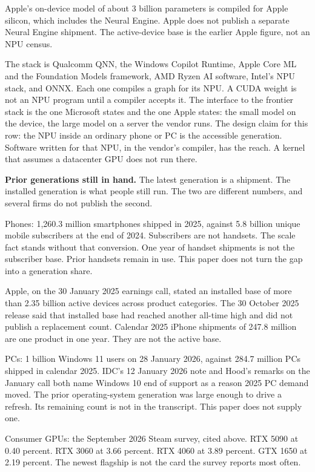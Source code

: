 \documentclass[
  10pt,
]{article}
\begin{document}
Apple's on-device model of about 3 billion parameters is compiled for
Apple silicon, which includes the Neural Engine. Apple does not publish
a separate Neural Engine shipment. The active-device base is the earlier
Apple figure, not an NPU census.

The stack is Qualcomm QNN, the Windows Copilot Runtime, Apple Core ML
and the Foundation Models framework, AMD Ryzen AI software, Intel's NPU
stack, and ONNX. Each one compiles a graph for its NPU. A CUDA weight is
not an NPU program until a compiler accepts it. The interface to the
frontier stack is the one Microsoft states and the one Apple states: the
small model on the device, the large model on a server the vendor runs.
The design claim for this row: the NPU inside an ordinary phone or PC is
the accessible generation. Software written for that NPU, in the
vendor's compiler, has the reach. A kernel that assumes a datacenter GPU
does not run there.

\textbf{Prior generations still in hand.} The latest generation is a
shipment. The installed generation is what people still run. The two are
different numbers, and several firms do not publish the second.

Phones: 1,260.3 million smartphones shipped in 2025, against 5.8 billion
unique mobile subscribers at the end of 2024. Subscribers are not
handsets. The scale fact stands without that conversion. One year of
handset shipments is not the subscriber base. Prior handsets remain in
use. This paper does not turn the gap into a generation share.

Apple, on the 30 January 2025 earnings call, stated an installed base of
more than 2.35 billion active devices across product categories. The 30
October 2025 release said that installed base had reached another
all-time high and did not publish a replacement count. Calendar 2025
iPhone shipments of 247.8 million are one product in one year. They are
not the active base.

PCs: 1 billion Windows 11 users on 28 January 2026, against 284.7
million PCs shipped in calendar 2025. IDC's 12 January 2026 note and
Hood's remarks on the January call both name Windows 10 end of support
as a reason 2025 PC demand moved. The prior operating-system generation
was large enough to drive a refresh. Its remaining count is not in the
transcript. This paper does not supply one.

Consumer GPUs: the September 2026 Steam survey, cited above. RTX 5090 at
0.40 percent. RTX 3060 at 3.66 percent. RTX 4060 at 3.89 percent. GTX
1650 at 2.19 percent. The newest flagship is not the card the survey
reports most often.
\end{document}
